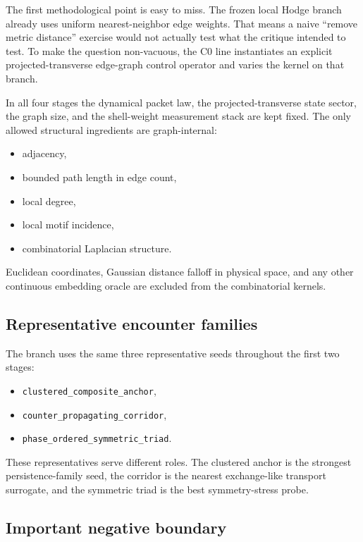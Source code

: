 \documentclass[11pt]{article}
\begin{document}
The first methodological point is easy to miss. The frozen local Hodge branch already uses uniform nearest-neighbor edge weights. That means a naive ``remove metric distance'' exercise would not actually test what the critique intended to test. To make the question non-vacuous, the C0 line instantiates an explicit projected-transverse edge-graph control operator and varies the kernel on that branch.

In all four stages the dynamical packet law, the projected-transverse state sector, the graph size, and the shell-weight measurement stack are kept fixed. The only allowed structural ingredients are graph-internal:
\begin{itemize}
\item adjacency,
\item bounded path length in edge count,
\item local degree,
\item local motif incidence,
\item combinatorial Laplacian structure.
\end{itemize}

Euclidean coordinates, Gaussian distance falloff in physical space, and any other continuous embedding oracle are excluded from the combinatorial kernels.

\subsection{Representative encounter families}

The branch uses the same three representative seeds throughout the first two stages:
\begin{itemize}
\item \texttt{clustered\_composite\_anchor},
\item \texttt{counter\_propagating\_corridor},
\item \texttt{phase\_ordered\_symmetric\_triad}.
\end{itemize}

These representatives serve different roles. The clustered anchor is the strongest persistence-family seed, the corridor is the nearest exchange-like transport surrogate, and the symmetric triad is the best symmetry-stress probe.

\subsection{Important negative boundary}
\end{document}
